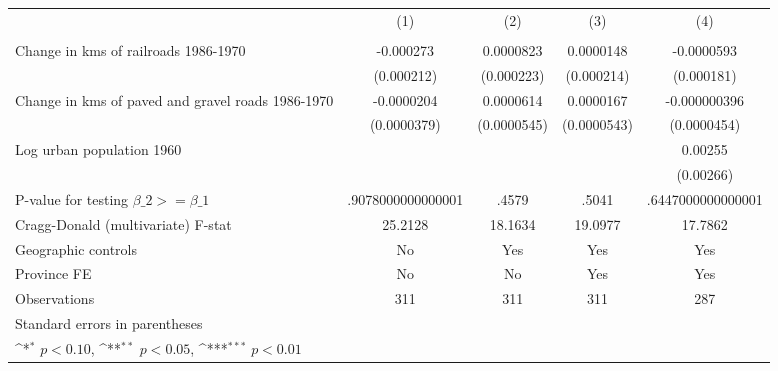 {
\def\sym#1{\ifmmode^{#1}\else\(^{#1}\)\fi}
\begin{tabular}{l*{4}{c}}
\hline\hline
                &\multicolumn{1}{c}{(1)}&\multicolumn{1}{c}{(2)}&\multicolumn{1}{c}{(3)}&\multicolumn{1}{c}{(4)}\\
                &\multicolumn{1}{c}{}&\multicolumn{1}{c}{}&\multicolumn{1}{c}{}&\multicolumn{1}{c}{}\\
\hline
Change in kms of railroads 1986-1970&-0.000273         &0.0000823         &0.0000148         &-0.0000593         \\
                &(0.000212)         &(0.000223)         &(0.000214)         &(0.000181)         \\
[1em]
Change in kms of paved and gravel roads 1986-1970&-0.0000204         &0.0000614         &0.0000167         &-0.000000396         \\
                &(0.0000379)         &(0.0000545)         &(0.0000543)         &(0.0000454)         \\
[1em]
Log urban population 1960&                  &                  &                  &  0.00255         \\
                &                  &                  &                  &(0.00266)         \\
\hline
P-value for testing $\beta\_{2} >= \beta\_{1}$&.9078000000000001         &    .4579         &    .5041         &.6447000000000001         \\
Cragg-Donald (multivariate) F-stat&  25.2128         &  18.1634         &  19.0977         &  17.7862         \\
Geographic controls&       No         &      Yes         &      Yes         &      Yes         \\
Province FE     &       No         &       No         &      Yes         &      Yes         \\
Observations    &      311         &      311         &      311         &      287         \\
\hline\hline
\multicolumn{5}{l}{\footnotesize Standard errors in parentheses}\\
\multicolumn{5}{l}{\footnotesize \sym{*} \(p<0.10\), \sym{**} \(p<0.05\), \sym{***} \(p<0.01\)}\\
\end{tabular}
}
